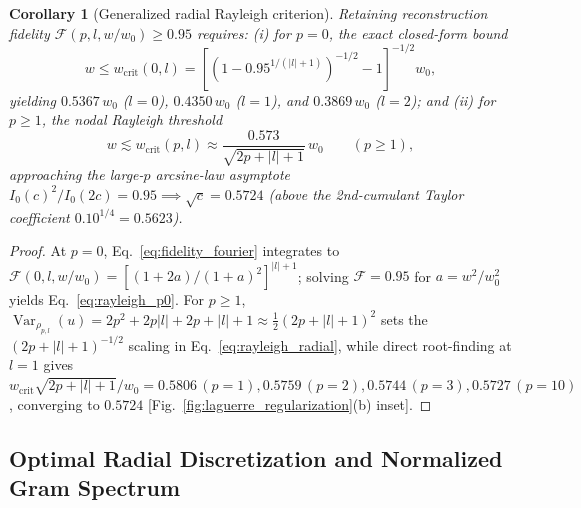 \documentclass[aps,pra,onecolumn,notitlepage,11pt,tightenlines,amsmath,amssymb,floatfix,longbibliography]{revtex4-2}
\providecommand{\abs}[1]{\lvert#1\rvert}
\newtheorem{corollary}{Corollary}
\begin{document}
\begin{corollary}[Generalized radial Rayleigh criterion]
\label{cor:rayleigh_radial}
Retaining reconstruction fidelity $\mathcal{F}(p,l,w/w_0) \ge 0.95$ requires: (i) for $p = 0$, the exact closed-form bound
\begin{equation}
w \le w_{\mathrm{crit}}(0,l) = \left[\left(1 - 0.95^{1/(\abs{l}+1)}\right)^{-1/2} - 1\right]^{-1/2} w_0,
\label{eq:rayleigh_p0}
\end{equation}
yielding $0.5367\,w_0$ ($l=0$), $0.4350\,w_0$ ($l=1$), and $0.3869\,w_0$ ($l=2$); and (ii) for $p \ge 1$, the nodal Rayleigh threshold
\begin{equation}
w \lesssim w_{\mathrm{crit}}(p,l) \approx \frac{0.573}{\sqrt{2p + \abs{l} + 1}}\,w_0 \qquad (p \ge 1),
\label{eq:rayleigh_radial}
\end{equation}
approaching the large-$p$ arcsine-law asymptote $I_0(c)^2/I_0(2c) = 0.95 \implies \sqrt{c} = 0.5724$ (above the 2nd-cumulant Taylor coefficient $0.10^{1/4} = 0.5623$).
\end{corollary}
\begin{proof}
At $p=0$, Eq.~\eqref{eq:fidelity_fourier} integrates to $\mathcal{F}(0,l,w/w_0) = [(1+2a)/(1+a)^2]^{\abs{l}+1}$; solving $\mathcal{F} = 0.95$ for $a = w^2/w_0^2$ yields Eq.~\eqref{eq:rayleigh_p0}. For $p \ge 1$, $\operatorname{Var}_{\rho_{p,l}}(u) = 2p^2 + 2p\abs{l} + 2p + \abs{l} + 1 \approx \frac{1}{2}(2p+\abs{l}+1)^2$ sets the $(2p+\abs{l}+1)^{-1/2}$ scaling in Eq.~\eqref{eq:rayleigh_radial}, while direct root-finding at $l=1$ gives $w_{\mathrm{crit}}\sqrt{2p+\abs{l}+1}/w_0 = 0.5806\,(p=1), 0.5759\,(p=2), 0.5744\,(p=3), 0.5727\,(p=10)$, converging to $0.5724$ [Fig.~\ref{fig:laguerre_regularization}(b) inset].
\end{proof}

\subsection{Optimal Radial Discretization and Normalized Gram Spectrum}
\label{subsec:gram_sampling}
\end{document}
